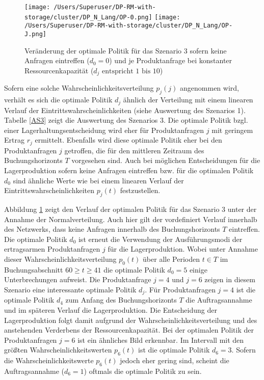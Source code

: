 \begin{figure}[h!]     
\begin{center}
\texttt{[image: /Users/Superuser/DP-RM-with-storage/cluster/DP\_N\_Lang/OP-0.png]}
\texttt{[image: /Users/Superuser/DP-RM-with-storage/cluster/DP\_N\_Lang/OP-J.png]}
    \caption{Veränderung der optimale Politik für das Szenario 3 sofern keine Anfragen eintreffen ($d_0=0$) und je Produktanfrage bei konstanter Ressourcenkapazität ($d_j\text{ entspricht }1\text{ bis }10$)}  \label{SV3}
  \end{center}
\end{figure}

Sofern eine solche Wahrscheinlichkeitsverteilung $p_j(j)$ angenommen wird, verhält es sich die optimale Politik $d_j$ ähnlich der Verteilung mit einem linearen Verlauf der Eintrittswahrscheinlichkeiten (siehe Auswertung des Szenarios 1). Tabelle \ref{AS3} zeigt die Auswertung des Szenarios 3. Die optimale Politik bzgl. einer Lagerhaltungsentscheidung wird eher für Produktanfragen $j$ mit geringem Ertrag $r_j$ ermittelt. Ebenfalls wird diese optimale Politik eher bei den Produktanfragen $j$ getroffen, die für den mittleren Zeitraum des Buchungshorizonts $T$ vorgesehen sind. Auch bei möglichen Entscheidungen für die Lagerproduktion sofern keine Anfragen eintreffen bzw. für die optimalen Politik $d_0$ sind ähnliche Werte wie bei einem linearen Verlauf der Eintrittswahrscheinlichkeiten $p_j(t)$ festzustellen.

Abbildung \ref{SV3} zeigt den Verlauf der optimalen Politik für das Szenario 3 unter der Annahme der Normalverteilung. Auch hier gilt der vordefiniert Verlauf innerhalb des Netzwerks, dass keine Anfragen innerhalb des Buchungshorizonts $T$ eintreffen. Die optimale Politik $d_0$ ist erneut die Verwendung der Ausführungsmodi der ertragsarmen Produktanfragen $j$ für die Lagerproduktion. Wobei unter Annahme dieser Wahrscheinlichkeitsverteilung $p_0(t)$ über alle Perioden $t\in T$ im Buchungsabschnitt $60\ge t \ge 41$ die optimale Politik $d_0=5$ einige Unterbrechungen aufweist. Die Produktanfrage $j=4$ und $j=6$ zeigen in diesem Szenario eine interessante optimale Politik $d_j$. Für Produktanfragen $j=4$ ist die optimale Politik $d_4$ zum Anfang des Buchungshorizonts $T$ die Auftragsannahme und im späteren Verlauf die Lagerproduktion. Die Entscheidung der Lagerproduktion folgt damit aufgrund der Wahrscheinlichkeitsverteilung und des anstehenden Verderbens der Ressourcenkapazität. Bei der optimalen Politik der Produktanfragen $j=6$ ist ein ähnliches Bild erkennbar. Im Intervall mit den größten Wahrscheinlichkeitswerten $p_6(t)$ ist die optimale Politik $d_6=3$. Sofern die Wahrscheinlichkeitswerte $p_6(t)$ jedoch eher gering sind, scheint die Auftragsannahme ($d_6=1$) oftmals die optimale Politik zu sein. 

